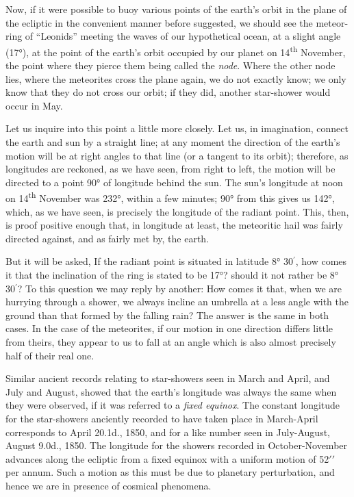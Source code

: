 \documentclass[a4paper, 12pt, oneside, polutonikogreek, english]{article}
\begin{document}
Now, if it were possible to buoy various points of the earth's orbit in the plane of the ecliptic in the convenient manner before suggested, we should see the meteor-ring of ``Leonids'' meeting the waves of our hypothetical ocean, at a slight angle (17°), at the point of the earth's orbit occupied by our planet on 14\textsuperscript{th} November, the point where they pierce them being called the \emph{node}. Where the other node lies, where the meteorites cross the plane again, we do not exactly know; we only know that they do not cross our orbit; if they did, another star-shower would occur in May.

Let us inquire into this point a little more closely. Let us, in imagination, connect the earth and sun by a straight line; at any moment the direction of the earth's motion will be at right angles to that line (or a tangent to its orbit); therefore, as longitudes are reckoned, as we have seen, from right to left, the motion will be directed to a point 90° of longitude behind the sun. The sun's longitude at noon on 14\textsuperscript{th} November was 232°, within a few minutes; 90° from this gives us 142°, which, as we have seen, is precisely the longitude of the radiant point. This, then, is proof positive enough that, in longitude at least, the meteoritic hail was fairly directed against, and as fairly met by, the earth.

But it will be asked, If the radiant point is situated in latitude 8° 30$^{\prime}$, how comes it that the inclination of the ring is stated to be 17°? should it not rather be 8° 30$^{\prime}$? To this question we may reply by another: How comes it that, when we are hurrying through a shower, we always incline an umbrella at a less angle with the ground than that formed by the falling rain? The answer is the same in both cases. In the case of the meteorites, if our motion in one direction differs little from theirs, they appear to us to fall at an angle which is also almost precisely half of their real one.

Similar ancient records relating to star-showers seen in March and April, and July and August, showed that the earth's longitude was always the same when they were observed, if it was referred to a \emph{fixed equinox}. The constant longitude for the star-showers anciently recorded to have taken place in March-April corresponds to April 20.1d., 1850, and for a like number seen in July-August, August 9.0d., 1850. The longitude for the showers recorded in October-November advances along the ecliptic from a fixed equinox with a uniform motion of 52$\prime\prime$ per annum. Such a motion as this must be due to planetary perturbation, and hence we are in presence of cosmical phenomena.
\end{document}
